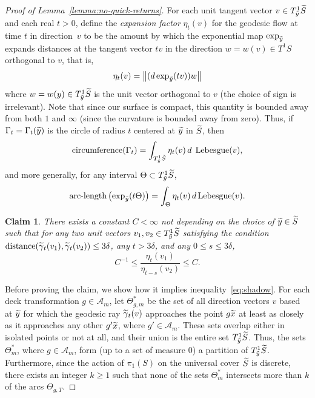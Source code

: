 \documentclass[AHL, Unicode, longabstracts, published]{cedram}
\newtheorem{claim}{Claim}}
\DeclareMathOperator{\Lebesgue}{Lebesgue}
\DeclareMathOperator{\distance}{distance}
\let\oldtilde\tilde
\renewcommand*{\tilde}[1]{\mathchoice{\widetilde{#1}}{\widetilde{#1}}{\oldtilde{#1}}{\oldtilde{#1}}}\let\oldforall\forall
\renewcommand*{\forall}{\mathrel{\oldforall}}
\begin{document}
\begin{proof}[Proof of Lemma~\ref{lemma:no-quick-returns}]
For each unit tangent vector $v \in T^{1}_{\tilde{y}}\tilde{S}$ and each real $t>0$, define the \emph{expansion factor} $\eta_{t}(v)$ for the geodesic flow at time $t$ in direction~$v$ to be the amount by which the exponential map $\exp _{\tilde{y}}$ expands distances at the tangent vector $tv$ in the direction $w=w(v)\in T^{1}S$ orthogonal to $v$, that is,
\[
\eta_{t}(v)= \left\|(d\exp_{\tilde{y}}(t v))w\right\|
\]
where $w=w(y)\in T^{1}_{\tilde{y}}\tilde{S}$ is the unit vector orthogonal to $v$ (the choice of sign is irrelevant). Note that since our surface is compact, this quantity is bounded away from both $1$ and $\infty$ (since the curvature is bounded away from zero). Thus, if $\Gamma_{t}=\Gamma_{t}(\tilde{y})$ is the circle of radius $t$ centered at $\tilde{y}$ in $\tilde{S}$, then
\begin{equation}\label{eq:expansionFormulaC}
\textrm{circumference}(\Gamma_{t})= \int_{T^{1}_{\tilde{y}}\tilde{S}}\eta_{t}(v) \, d\;\Lebesgue(v),
\end{equation}
and more generally, for any interval $\Theta \subset T^{1}_{\tilde{y}}\tilde{S}$,
\begin{equation}\label{eq:expansionFormulaG}
\textrm{arc-length} \left(\exp_{\tilde{y}}(t \Theta)\right)=\int_{\Theta}\eta_{t}(v) \, d \Lebesgue(v).
\end{equation}

\begin{claim}\label{claim:expansionFactor}
There exists a constant $C<\infty$ not depending on the choice of $\tilde{y}\in \tilde{S}$ such that for any two unit vectors $v_{1},v_{2}\in T^{1}_{\tilde{y}}\tilde{S}$ satisfying the condition $\distance(\tilde{\gamma}_{t}(v_{1}),\tilde{\gamma}_{t}(v_{2}))\leq 3\delta$, any $t> 3 \delta$, and any $0\leq s\leq 3\delta$,
\begin{equation}\label{eq:expansionBounds}
C^{-1}\leq \frac{\eta_{t}(v_{1})}{\eta_{t-s}(v_{2})} \leq C.
\end{equation}
\end{claim}

Before proving the claim, we show how it implies inequality~\eqref{eq:shadow}. For each deck transformation $g\in \mathcal{A}_{m}$, let $\Theta^{*}_{g,m}$ be the set of all direction vectors $v$ based at $\tilde{y}$ for which the geodesic ray $\tilde{\gamma}_{t}(v)$ approaches the point $g \tilde{x}$ at least as closely as it approaches any other $g' \tilde{x}$, where $g' \in \mathcal{A}_{m}$. These sets overlap either in isolated points or not at all, and their union is the entire set $T^{1}_{\tilde{y}}\tilde{S}$. Thus, the sets $\Theta^{*}_{m}$, where $g \in \mathcal{A}_{m}$, form (up to a set of measure $0$) a partition of $T^{1}_{\tilde{y}}\tilde{S}$. Furthermore, since the action of $\pi_{1}(S)$ on the universal cover $\tilde{S}$ is discrete, there exists an integer $k \geq1$ such that none of the sets $\Theta^{*}_{m}$ intersects more than $k$ of the arcs $\Theta_{g,T}$.


\end{proof}
\end{document}
